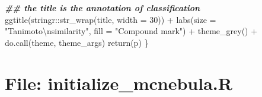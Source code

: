 \documentclass[
]{article}
\newenvironment{Shaded}{\begin{snugshade}}{\end{snugshade}}
\newcommand{\AttributeTok}[1]{\textcolor[rgb]{0.77,0.63,0.00}{#1}}
\newcommand{\DecValTok}[1]{\textcolor[rgb]{0.00,0.00,0.81}{#1}}
\newcommand{\DocumentationTok}[1]{\textcolor[rgb]{0.56,0.35,0.01}{\textbf{\textit{#1}}}}
\newcommand{\FunctionTok}[1]{\textcolor[rgb]{0.00,0.00,0.00}{#1}}
\newcommand{\NormalTok}[1]{#1}
\newcommand{\SpecialCharTok}[1]{\textcolor[rgb]{0.00,0.00,0.00}{#1}}
\newcommand{\StringTok}[1]{\textcolor[rgb]{0.31,0.60,0.02}{#1}}
\begin{document}
\begin{Shaded}
\begin{Highlighting}[]
      \DocumentationTok{\#\# the title is the annotation of classification}
      \FunctionTok{ggtitle}\NormalTok{(stringr}\SpecialCharTok{::}\FunctionTok{str\_wrap}\NormalTok{(title, }\AttributeTok{width =} \DecValTok{30}\NormalTok{)) }\SpecialCharTok{+}
      \FunctionTok{labs}\NormalTok{(}\AttributeTok{size =} \StringTok{"Tanimoto}\SpecialCharTok{\textbackslash{}n}\StringTok{similarity"}\NormalTok{, }\AttributeTok{fill =} \StringTok{"Compound mark"}\NormalTok{) }\SpecialCharTok{+}
      \FunctionTok{theme\_grey}\NormalTok{() }\SpecialCharTok{+}
      \FunctionTok{do.call}\NormalTok{(theme, theme\_args)}
    \FunctionTok{return}\NormalTok{(p)}
\NormalTok{  \}}
\end{Highlighting}
\end{Shaded}

\hypertarget{file-initialize_mcnebula.r}{%
\section{File: initialize\_mcnebula.R}\label{file-initialize_mcnebula.r}}
\end{document}
